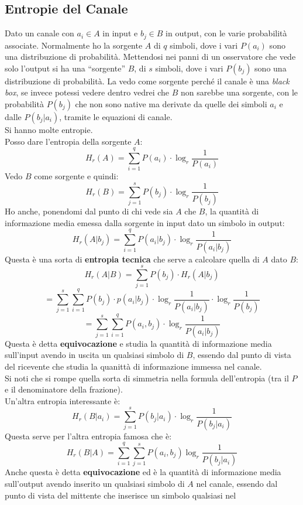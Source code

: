 \documentclass[a4paper,12pt, oneside]{book}
\begin{document}
\subsection{Entropie del Canale}
Dato un canale con $a_i\in A$ in input e $b_j\in B$ in output, con le varie
probabilità associate. Normalmente ho la sorgente $A$ di $q$ simboli, dove i
vari $P(a_i)$ sono una distribuzione di probabilità. Mettendosi 
nei panni di un osservatore che vede solo l'output si ha una ``sorgente'' $B$,
di $s$ simboli, dove i vari $P(b_j)$ sono una distribuzione di probabilità. La
vedo come sorgente perché il canale è una \textit{black box}, se invece potessi
vedere dentro vedrei che $B$ non sarebbe una sorgente, con le probabilità
$P(b_j)$ che non sono native ma derivate da quelle dei simboli $a_i$ e dalle
$P(b_j|a_i)$, tramite le equazioni di canale. \\
Si hanno molte entropie.\\
Posso dare l'entropia della sorgente $A$:
\[H_r(A)=\sum_{i=1}^q P(a_i)\cdot \log_r\frac{1}{P(a_i)}\]
Vedo $B$ come sorgente e quindi:
\[H_r(B)=\sum_{j=1}^s P(b_j)\cdot \log_r\frac{1}{P(b_j)}\]
Ho anche, ponendomi dal punto di chi vede sia $A$ che $B$, la quantità di
informazione media emessa dalla sorgente in input dato un simbolo in output:
\[H_r(A|b_j)=\sum_{i=1}^q P(a_i|b_j)\cdot \log_r\frac{1}{P(a_i|b_j)}\]
Questa è una sorta di \textbf{entropia tecnica} che serve a calcolare quella di
$A$ dato $B$:
\[H_r(A|B)=\sum_{j=1}^s P(b_j)\cdot H_r(A|b_j)\]
\[=\sum_{j=1}^s\sum_{i=1}^q P(b_j)\cdot p(a_i|b_j)\cdot
  \log_r\frac{1}{P(a_i|b_j)}\cdot \log_r\frac{1}{P(b_j)}\]
\[=\sum_{j=1}^s\sum_{i=1}^q P(a_i,b_j)\cdot \log_r\frac{1}{P(a_i|b_j)}\]
Questa è detta \textbf{equivocazione} e studia la quantità di informazione media
sull'input avendo in uscita un qualsiasi simbolo di $B$, essendo dal punto di
vista del ricevente che studia la quanittà di informazione immessa nel canale.\\
Si noti che si rompe quella sorta di simmetria nella formula dell'entropia (tra
il $P$ e il denominatore della frazione).\\
Un'altra entropia interessante è:
\[H_r(B|a_i)=\sum_{j=1}^s P(b_j|a_i)\cdot \log_r\frac{1}{P(b_j|a_i)}\]
Questa serve per l'altra entropia famosa che è:
\[H_r(B|A)=\sum_{i=1}^q\sum_{j=1}^s P(a_i,b_j)\log_r\frac{1}{P(b_j|a_i)}\]
Anche questa è detta \textbf{equivocazione} ed è la quantità di informazione
media sull'output avendo inserito un qualsiasi simbolo di $A$ nel canale,
essendo dal punto di vista del mittente che inserisce un simbolo qualsiasi nel
\end{document}
